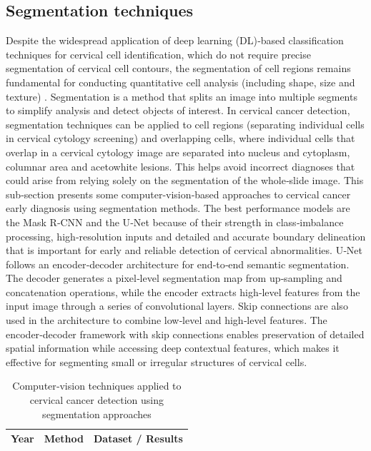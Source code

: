 \documentclass{svjour3}
\begin{document}
\subsection{Segmentation techniques}
Despite the widespread application of deep learning (DL)‑based classification techniques for cervical cell identification, which do not require precise segmentation of cervical cell contours, the segmentation of cell regions remains fundamental for conducting quantitative cell analysis (including shape, size and texture) \cite{ref6}. Segmentation is a method that splits an image into multiple segments to simplify analysis and detect objects of interest. In cervical cancer detection, segmentation techniques can be applied to cell regions (separating individual cells in cervical cytology screening) and overlapping cells, where individual cells that overlap in a cervical cytology image are separated into nucleus and cytoplasm, columnar area and acetowhite lesions. This helps avoid incorrect diagnoses that could arise from relying solely on the segmentation of the whole‑slide image.
This sub‑section presents some computer‑vision‑based approaches to cervical cancer early diagnosis using segmentation methods. The best performance models are the Mask R‑CNN \cite{ref65,ref66} and the U‑Net \cite{ref67} because of their strength in class‑imbalance processing, high‑resolution inputs and detailed and accurate boundary delineation that is important for early and reliable detection of cervical abnormalities. U‑Net follows an encoder‑decoder architecture for end‑to‑end semantic segmentation. The decoder generates a pixel‑level segmentation map from up‑sampling and concatenation operations, while the encoder extracts high‑level features from the input image through a series of convolutional layers. Skip connections are also used in the architecture to combine low‑level and high‑level features. The encoder‑decoder framework with skip connections enables preservation of detailed spatial information while accessing deep contextual features, which makes it effective for segmenting small or irregular structures of cervical cells.
\begin{table}[htbp]
\centering
\caption{Computer‑vision techniques applied to cervical cancer detection using segmentation approaches}
\label{tab:segmentation}
\begin{tabular}{lll}
\hline
Year & Method & Dataset / Results \\
\hline
\hline
\end{tabular}
\end{table}
\end{document}
